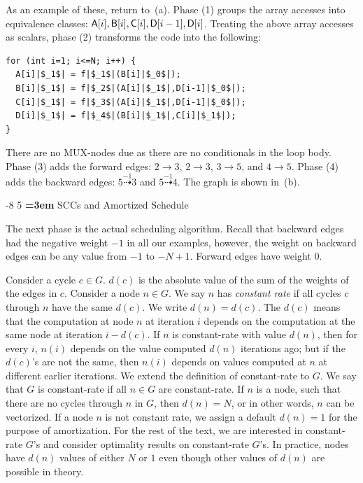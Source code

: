 \documentclass[sigconf, screen, natbib=false, dvipsnames, table]{acmart}
\makeatletter
\renewcommand{\subsection}{\@startsection{subsection}{2}{\z@}%
                        {-8\p@ \@plus -4\p@ \@minus -4\p@}%
                        {5\p@ \@plus 2\p@ \@minus 2\p@}%
                        {\normalfont\Large\bfseries\boldmath
                         \rightskip=\z@ \@plus 3em\pretolerance=10000 }}
\theoremstyle{definition}
\makeatother
\begin{document}
As an example of these, return to~(a). Phase (1) groups the array accesses into equivalence classes:
${\sf A}[i], {\sf B}[i], {\sf C}[i], {\sf D}[i-1], {\sf D}[i]$. Treating the above array accesses as scalars, phase (2) transforms the code into the following:

\begin{verbatim}
for (int i=1; i<=N; i++) {
  A[i]|$_1$| = f|$_1$|(B[i]|$_0$|);
  B[i]|$_1$| = f|$_2$|(A[i]|$_1$|,D[i-1]|$_0$|);
  C[i]|$_1$| = f|$_3$|(A[i]|$_1$|,D[i-1]|$_0$|);
  D[i]|$_1$| = f|$_4$|(B[i]|$_1$|,C[i]|$_1$|);
}
\end{verbatim}

There are no MUX-nodes due as there are no conditionals in the loop body. Phase (3) adds the forward edges:
$2 \rightarrow 3$, $2 \rightarrow 3$, $3 \rightarrow 5$, and $4 \rightarrow 5$. Phase (4) adds the backward edges:
$5 \stackrel{-1}{\dasharrow} 3$ and $5 \stackrel{-1}{\dasharrow} 4$. The graph is shown in~(b).



\subsection{SCCs and Amortized Schedule}
\label{sec:scc}

The next phase is the actual scheduling algorithm. Recall that backward edges had
the negative weight $-1$ in all our examples, however, the weight on backward edges can be any value from $-1$ 
to $-N+1$. Forward edges have weight 0.

Consider a cycle $c \in G$. $d(c)$ is the absolute value of the sum of the weights of the edges in $c$. Consider a 
node $n \in G$. We say $n$ has \emph{constant rate} if all cycles $c$ through $n$ have the same $d(c)$. We write 
$d(n) = d(c)$. The $d(c)$ means that the computation at node $n$ at iteration $i$ depends on the computation 
at the same node at iteration $i-d(c)$. If $n$ is constant-rate with value $d(n)$, then for every $i$, $n(i)$
depends on the value computed $d(n)$ iterations ago; but if the $d(c)$'s are not the same, then $n(i)$ depends on 
values computed at $n$ at different earlier iterations. We extend the definition of constant-rate to $G$. We say that 
$G$ is constant-rate if all $n \in G$ are constant-rate. If $n$ is a node, such that there are no cycles through $n$ in $G$, 
then $d(n) = N$, or in other words, $n$ can be vectorized. If a node $n$ is not constant rate, we assign a default $d(n) = 1$ 
for the purpose of amortization. For the rest of the text, we are interested in constant-rate $G$'s and consider optimality 
results on constant-rate $G$'s. In practice, nodes have $d(n)$ values of either $N$ or $1$ even though other values of 
$d(n)$ are possible in theory. 
\end{document}
